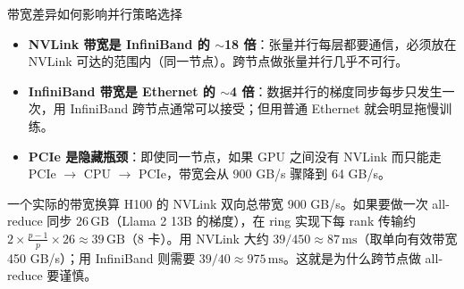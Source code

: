 \begin{table}[H]
\centering
\small
{}
\caption{主流 GPU 互联技术带宽对比（数值为近似峰值，实际有效带宽通常为峰值的 60\%--85\%）}
\end{table}

\begin{importantbox}{带宽差异如何影响并行策略选择}
\begin{itemize}
    \item \textbf{NVLink 带宽是 InfiniBand 的 $\sim$18 倍}：张量并行每层都要通信，必须放在 NVLink 可达的范围内（同一节点）。跨节点做张量并行几乎不可行。
    \item \textbf{InfiniBand 带宽是 Ethernet 的 $\sim$4 倍}：数据并行的梯度同步每步只发生一次，用 InfiniBand 跨节点通常可以接受；但用普通 Ethernet 就会明显拖慢训练。
    \item \textbf{PCIe 是隐藏瓶颈}：即使同一节点，如果 GPU 之间没有 NVLink 而只能走 PCIe $\to$ CPU $\to$ PCIe，带宽会从 900 GB/s 骤降到 64 GB/s。
\end{itemize}
\end{importantbox}

\begin{knowledgebox}{一个实际的带宽换算}
H100 的 NVLink 双向总带宽 900 GB/s。如果要做一次 all-reduce 同步 $26\,\text{GB}$（Llama 2 13B 的梯度），在 ring 实现下每 rank 传输约 $2 \times \frac{p-1}{p} \times 26 \approx 39\,\text{GB}$（8 卡）。用 NVLink 大约 $39/450 \approx 87\,\text{ms}$（取单向有效带宽 450 GB/s）；用 InfiniBand 则需要 $39/40 \approx 975\,\text{ms}$。这就是为什么跨节点做 all-reduce 要谨慎。
\end{knowledgebox}

